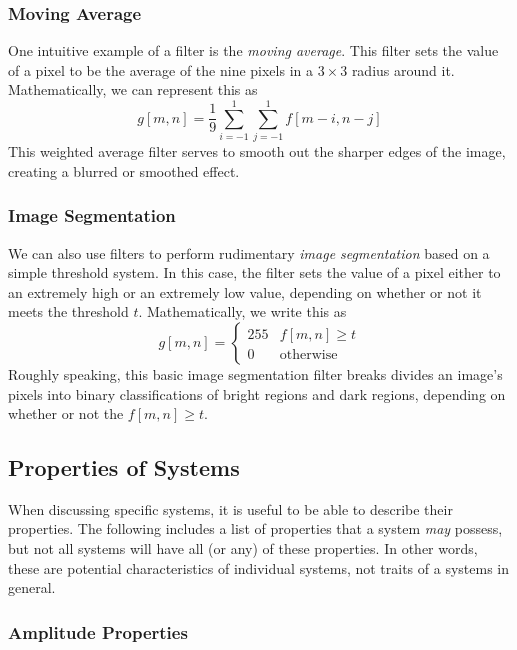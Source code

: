 \documentclass{article}
\begin{document}
\subsubsection*{Moving Average}
One intuitive example of a filter is the \emph{moving average}. This filter sets the value of a pixel to be the average of the nine pixels in a $3 \times 3$ radius around it. Mathematically, we can represent this as
\[
	g[m, n] = \frac{1}{9} \sum\limits_{i = -1}^{1}\sum\limits_{j = -1}^{1} f[m - i, n - j] \tag{Weighted Average}
\]
This weighted average filter serves to smooth out the sharper edges of the image, creating a blurred or smoothed effect.

\subsubsection*{Image Segmentation}
We can also use filters to perform rudimentary \emph{image segmentation} based on a simple threshold system. In this case, the filter sets the value of a pixel either to an extremely high or an extremely low value, depending on whether or not it meets the threshold $t$. Mathematically, we write this as
\[
	g[m, n] = \begin{cases} 255 & f[m, n] \geq t \\ 0 & \text{otherwise}\end{cases} \tag{Threshold}
\]
Roughly speaking, this basic image segmentation filter breaks divides an image's pixels into binary classifications of bright regions and dark regions, depending on whether or not the $f[m, n] \geq t$.

\subsection{Properties of Systems}

When discussing specific systems, it is useful to be able to describe their properties. The following includes a list of properties that a system \emph{may} possess, but not all systems will have all (or any) of these properties. In other words, these are potential characteristics of individual systems, not traits of a systems in general.

\subsubsection*{Amplitude Properties}
\end{document}
